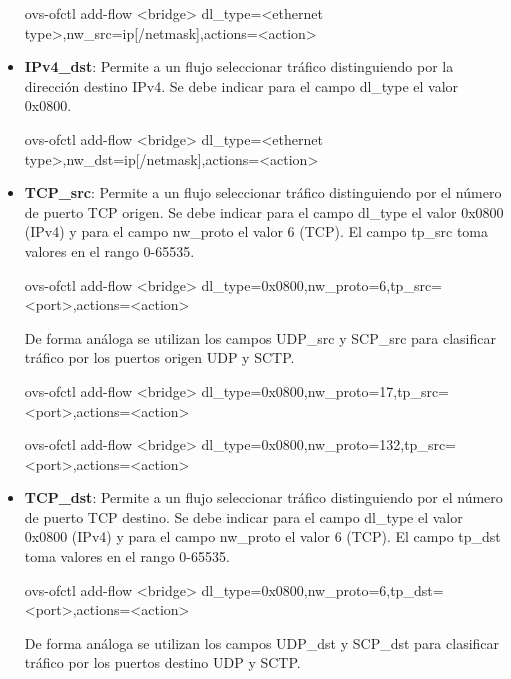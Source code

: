 \begin{itemize}
\begin{center}
ovs-ofctl add-flow <bridge> dl\_type=<ethernet type>,nw\_src=ip[/netmask],actions=<action>
\end{center}

\item \textbf{IPv4\_dst}: Permite a un flujo seleccionar tr\'afico distinguiendo por la dirección destino IPv4. Se debe indicar para el campo dl\_type el valor 0x0800.  

\begin{center}
ovs-ofctl add-flow <bridge> dl\_type=<ethernet type>,nw\_dst=ip[/netmask],actions=<action>
\end{center}
 
\item \textbf{TCP\_src}: Permite a un flujo seleccionar tr\'afico distinguiendo por el n\'umero de puerto TCP origen. Se debe indicar para el campo dl\_type el valor 0x0800 (IPv4) y para el campo nw\_proto el valor 6 (TCP). El campo tp\_src toma valores en el rango 0-65535.

\begin{center}
ovs-ofctl add-flow <bridge> dl\_type=0x0800,nw\_proto=6,tp\_src=<port>,actions=<action>
\end{center}

De forma análoga se utilizan los campos UDP\_src y SCP\_src para clasificar tr\'afico por los puertos origen UDP y SCTP.

\begin{center}
ovs-ofctl add-flow <bridge> dl\_type=0x0800,nw\_proto=17,tp\_src=<port>,actions=<action>
\end{center}

\begin{center}
ovs-ofctl add-flow <bridge> dl\_type=0x0800,nw\_proto=132,tp\_src=<port>,actions=<action>
\end{center}

\item \textbf{TCP\_dst}: Permite a un flujo seleccionar tr\'afico distinguiendo por el n\'umero de puerto TCP destino. Se debe indicar para el campo dl\_type el valor 0x0800 (IPv4) y para el campo nw\_proto el valor 6 (TCP). El campo tp\_dst toma valores en el rango 0-65535.

\begin{center}
ovs-ofctl add-flow <bridge> dl\_type=0x0800,nw\_proto=6,tp\_dst=<port>,actions=<action>
\end{center}

De forma análoga se utilizan los campos UDP\_dst y SCP\_dst para clasificar tr\'afico por los puertos destino UDP y SCTP.


\end{itemize}
